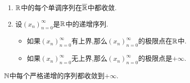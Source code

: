 \begin{proposition}{}{}
	\begin{enumerate}
		\item $\mathbb{R}$中的每个单调序列在$\overline{\mathbb{R}}$中都收敛.
		\item 设$\left(x_{n}\right)_{n=0}^{\infty}$是$\mathbb{R}$中的递增序列.
		\begin{itemize}
			\item 如果$\left(x_{n}\right)_{n=0}^{\infty}$有上界,那么$\left(x_{n}\right)_{n=0}^{\infty}$的极限点在$\mathbb{R}$中.
			\item 如果$\left(x_{n}\right)_{n=0}^{\infty}$无上界,那么$\left(x_{n}\right)_{n=0}^{\infty}$的极限点是$+\infty$.
		\end{itemize}
	\end{enumerate}
\end{proposition}

\begin{remark}{}{}
	$\mathbb{N}$中每个严格递增的序列都收敛到$+\infty$.
\end{remark}